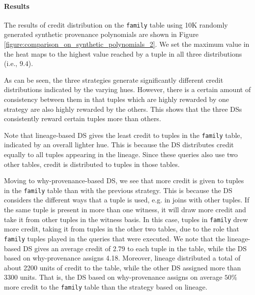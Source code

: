 \paragraph{Results} The results of credit distribution on the \texttt{family} table using 10K randomly generated synthetic provenance polynomials are shown in
Figure \ref{figure:comparison_on_synthetic_polynomials_2}. 
We set the maximum value in the heat maps to the highest value reached by a tuple in all three distributions (i.e., $9.4$). 

As can be seen, the three strategies generate significantly different credit distributions indicated by the varying hues. 
However, there is a certain amount of consistency between them in that tuples which are highly rewarded by one strategy are also highly rewarded by the others. This shows that the three DSs consistently reward certain tuples more than others. 

Note that lineage-based DS gives the least credit to tuples in the \texttt{family} table, indicated by an overall lighter hue. This is because the DS  distributes credit equally to all tuples appearing in the lineage. Since these queries also use two other tables, credit is distributed to tuples in those tables.

Moving to why-provenance-based DS, we see that more credit is given to tuples in the \texttt{family} table than with the previous strategy. This is because the DS considers the different ways that a tuple is used, e.g. in joins with other tuples. If the same tuple is present in more than one witness, it will draw more credit and take it from  other tuples in the witness basis. In this case, tuples in \texttt{family} drew more credit, taking it from tuples in the other two tables, due to the role that \texttt{family}  tuples played in the queries that were executed. 
\textcolor{correction}{We note that the lineage-based DS gives an average credit of 2.79 to each tuple in the table, while the DS based on why-provenance assigns 4.18. Moreover, lineage distributed a total of about 2200 units of credit to the table, while the other DS assigned more than 3300 units. That is, the DS based on why-provenance assigns on average $50\%$ more credit to the \texttt{family} table than the strategy based on lineage.}



